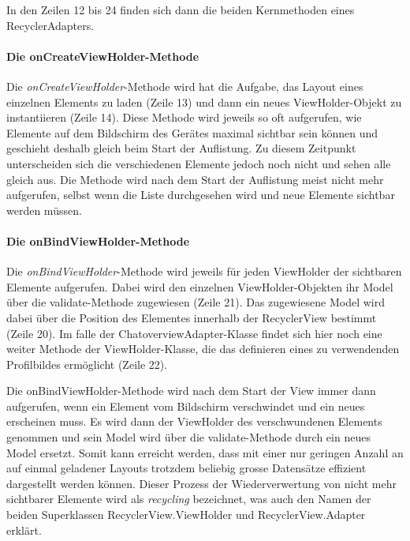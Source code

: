 \documentclass[../main.tex]{subfiles}
\begin{document}
	In den Zeilen 12 bis 24 finden sich dann die beiden Kernmethoden eines RecyclerAdapters.
	
	\paragraph{Die onCreateViewHolder-Methode}
	Die \emph{onCreateViewHolder}-Methode wird hat die Aufgabe, das Layout eines einzelnen Elements zu laden (Zeile 13) und dann ein neues ViewHolder-Objekt zu instantiieren (Zeile 14). Diese Methode wird jeweils so oft aufgerufen, wie Elemente auf dem Bildschirm des Gerätes maximal sichtbar sein können und geschieht deshalb gleich beim Start der Auflistung. Zu diesem Zeitpunkt unterscheiden sich die verschiedenen Elemente jedoch noch nicht und sehen alle gleich aus. Die Methode wird nach dem Start der Auflistung meist nicht mehr aufgerufen, selbst wenn die Liste durchgesehen wird und neue Elemente sichtbar werden müssen.
	
	\paragraph{Die onBindViewHolder-Methode}
	Die \emph{onBindViewHolder}-Methode wird jeweils für jeden ViewHolder der sichtbaren Elemente aufgerufen. Dabei wird den einzelnen ViewHolder-Objekten ihr Model über die validate-Methode zugewiesen (Zeile 21). Das zugewiesene Model wird dabei über die Position des Elementes innerhalb der RecyclerView bestimmt (Zeile 20). Im falle der ChatoverviewAdapter-Klasse findet sich hier noch eine weiter Methode der ViewHolder-Klasse, die das definieren eines zu verwendenden Profilbildes ermöglicht (Zeile 22).
	
	Die onBindViewHolder-Methode wird nach dem Start der View immer dann aufgerufen, wenn ein Element vom Bildschirm verschwindet und ein neues erscheinen muss. Es wird dann der ViewHolder des verschwundenen Elements genommen und sein Model wird über die validate-Methode durch ein neues Model ersetzt. Somit kann erreicht werden, dass mit einer nur geringen Anzahl an auf einmal geladener Layouts trotzdem beliebig grosse Datensätze effizient dargestellt werden können. Dieser Prozess der Wiederverwertung von nicht mehr sichtbarer Elemente wird als \emph{recycling} bezeichnet, was auch den Namen der beiden Superklassen RecyclerView.ViewHolder und RecyclerView.Adapter erklärt.
	
\end{document}
